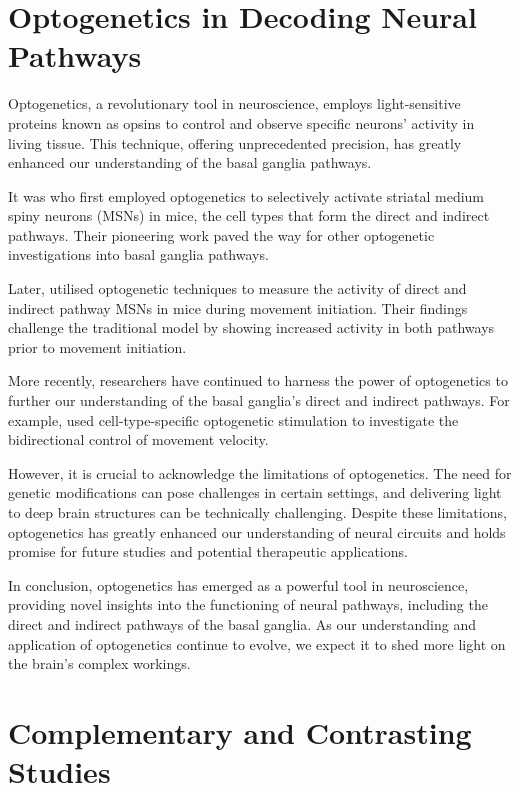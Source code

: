 \documentclass[10pt]{article}
\begin{document}
\begin{sloppypar}
  \section{Optogenetics in Decoding Neural Pathways}
  \label{sec:the-role-of-optogenetics-in-neural-pathways}

  Optogenetics, a revolutionary tool in neuroscience, employs light-sensitive proteins known as opsins to control and observe specific neurons’ activity in living tissue. This technique, offering unprecedented precision, has greatly enhanced our understanding of the basal ganglia pathways.

  It was \cite{kravitz_regulation_2010} who first employed optogenetics to selectively activate striatal medium spiny neurons (MSNs) in mice, the cell types that form the direct and indirect pathways. Their pioneering work paved the way for other optogenetic investigations into basal ganglia pathways.

  Later, \cite{cui_concurrent_2013} utilised optogenetic techniques to measure the activity of direct and indirect pathway MSNs in mice during movement initiation. Their findings challenge the traditional model by showing increased activity in both pathways prior to movement initiation.

  More recently, researchers have continued to harness the power of optogenetics to further our understanding of the basal ganglia’s direct and indirect pathways. For example, \cite{yttri_opponent_2016} used cell-type-specific optogenetic stimulation to investigate the bidirectional control of movement velocity.

  However, it is crucial to acknowledge the limitations of optogenetics. The need for genetic modifications can pose challenges in certain settings, and delivering light to deep brain structures can be technically challenging. Despite these limitations, optogenetics has greatly enhanced our understanding of neural circuits and holds promise for future studies and potential therapeutic applications.

  In conclusion, optogenetics has emerged as a powerful tool in neuroscience, providing novel insights into the functioning of neural pathways, including the direct and indirect pathways of the basal ganglia. As our understanding and application of optogenetics continue to evolve, we expect it to shed more light on the brain’s complex workings.

  \section{Complementary and Contrasting Studies}
  \label{sec:complementary-and-contrasting-studies}


\end{sloppypar}
\end{document}
